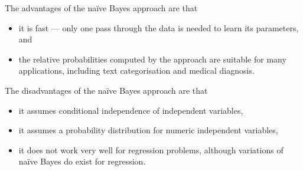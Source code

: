 The advantages of the na\"{i}ve Bayes approach are that
\begin{itemize}
  \item it is fast --- only one pass through the data is needed to learn its parameters, and
  \item the relative probabilities computed by the approach are suitable for many applications, including text categorisation and medical diagnosis.
\end{itemize}

The disadvantages of the na\"{i}ve Bayes approach are that
\begin{itemize}
  \item it assumes conditional independence of independent variables,
  \item it assumes a probability distribution for numeric independent variables,
  \item it does not work very well for regression problems, although variations of na\"{i}ve Bayes do exist for regression.
\end{itemize}
